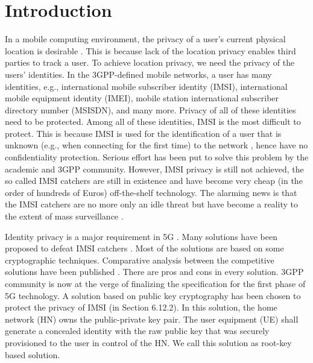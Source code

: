 \documentclass[conference]{IEEEtran}
\begin{document}
\section{Introduction} \label{intro}
In a mobile computing environment, the privacy of a user's current physical location is desirable \cite{Asokan_anonimity_1994,Varadharajan_anonimity_1997}. This is because lack of the location privacy enables third parties to track a user. To achieve location privacy, we need the privacy of the users' identities. In the 3GPP-defined mobile networks, a user has many identities, e.g., international mobile subscriber identity (IMSI), international mobile equipment identity (IMEI), mobile station international subscriber directory number (MSISDN), and many more. Privacy of all of these identities need to be protected. Among all of these identities, IMSI is the most difficult to protect. This is because IMSI is used for the identification of a user that is unknown (e.g., when connecting for the first time) to the network \cite{TS33401_inital_identification}, hence have no confidentiality protection. Serious effort has been put to solve this problem by the academic and 3GPP community. However, IMSI privacy is still not achieved, the so called IMSI catchers are still in existence \cite{catch_me_if_you_can, IMSI_Catcher_Adrian_2016, pets2017} and have become very cheap (in the order of hundreds of Euros) off-the-shelf \cite{IMSI_catcher_femtocell,Practical_attack_Altaf_shaik} technology. The alarming news is that the IMSI catchers are no more only an idle threat but have become a reality to the extent of mass surveillance \cite{washingtonpost2014}.

Identity privacy is a major requirement in 5G \cite{TS33501}. Many solutions have been proposed to defeat IMSI catchers \cite{TR33899}. Most of the solutions are based on some cryptographic techniques. Comparative analysis between the competitive solutions have been published \cite{ICTJournal}. There are pros and cons in every solution. 3GPP community is now at the verge of finalizing the specification for the first phase of 5G technology. A solution based on public key cryptography has been chosen to protect the privacy of IMSI \cite{TS33501} (in Section 6.12.2). In this solution, the home network (HN) owns the public-private key pair. The user equipment (UE) shall generate a concealed identity with the raw public key that was securely provisioned to the user in control of the HN. We call this solution as root-key based solution. 
\end{document}
